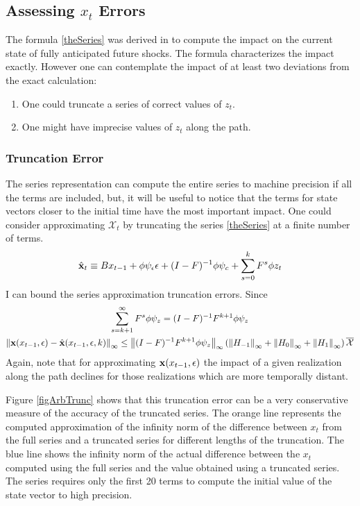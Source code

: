 \documentclass[12pt]{article}
\begin{document}
\subsection{Assessing $x_t$ Errors}
\label{sec:truncationerr}
The formula \ref{theSeries} was derived in \citep{anderson10}
to compute the impact on the current state of fully anticipated future shocks.  The formula characterizes the impact exactly.  However one can contemplate the impact of at least two deviations from the exact calculation:
\begin{enumerate}
\item One could truncate a series of correct values of $z_t$.  
\item One might have imprecise values of $z_t$ along the path.
\end{enumerate}
\subsubsection{Truncation Error}


The series representation can compute the entire series to machine precision
if all the terms are included, but, it will be useful to notice that
the terms for state vectors closer 
to the initial time have the most important impact.
One could consider approximating  $\mathcal{X}_t$ by 
truncating the series \ref{theSeries} at a finite number of terms.
 	 \begin{gather}
 	 \hat{\mathbf{x}}_t \equiv B x_{t-1}+ \phi \psi_\epsilon\epsilon  + (I - F)^{-1} \phi \psi_c + \sum_{s=0}^k F^s \phi z_{t}\label{theTruncSeries}
 \end{gather}
I can bound the  series approximation truncation errors.
Since
    \begin{gather}
      \label{eq:1}
\sum_{s=k+1}^{\infty} F^s \phi \psi_z = (I -F)^{-1} F^{k+1}\phi \psi_z       \\
\left\lVert\mathbf{x}(x_{t-1},\epsilon)-\hat{\mathbf{x}}(x_{t-1},\epsilon,k)\right\rVert_\infty \le \left\lVert(I -F)^{-1} F^{k+1}\phi \psi_z\right\rVert_\infty \left ( \left\lVert H_{-1} \right\rVert_\infty+ \left\lVert H_{0} \right\rVert_\infty+ \left\lVert H_{1} \right\rVert_\infty \right )\overline{\mathcal{X}}
    \end{gather}
Again, note that for approximating $\mathbf{x}(x_{t-1},\epsilon)$ the impact of  a given realization along the path declines for those realizations which are  more temporally distant.

 Figure \ref{figArbTrunc} shows
that this truncation error can be  a very conservative measure of the accuracy
of the truncated series.  The orange line represents the computed approximation of
the infinity norm of the difference between $x_t$ from the full series and a truncated series for different lengths of the truncation.  The blue line shows the infinity norm of the actual difference between the $x_t$ computed using the full series and the value obtained using a truncated series.  The series requires only the first 20 terms to compute
the initial value of the state vector to high precision. 
\end{document}
